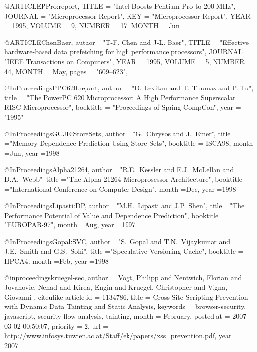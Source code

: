 @ARTICLE{PPro:report,
        TITLE = "Intel Boosts Pentium Pro to 200 MHz",
        JOURNAL = "Microprocessor Report",
        KEY = "Microprocessor Report",
        YEAR = 1995,
        VOLUME = 9,
        NUMBER = 17,
        MONTH = Jun
}


@ARTICLE{ChenBaer,
        author ="T-F. Chen and J-L. Baer",
        TITLE = "Effective hardware-based data prefetching for high performance processors",
        JOURNAL = "IEEE Transactions on Computers",
        YEAR = 1995,
        VOLUME = 5,
        NUMBER = 44,
        MONTH = May,
        pages = "609--623",
}

@InProceedings{PPC620:report,
  author =       "D. Levitan and T. Thomas and P. Tu",
  title =        "The PowerPC 620 Microprocessor: A High Performance Superscalar RISC Microprocessor",
  booktitle =    "Proceedings of Spring CompCon",
  year =         "1995"
}


@InProceedings{GCJE:StoreSets,
        author          ="G.~Chrysos and J.~Emer",
        title           ="Memory Dependence Prediction Using Store Sets",
        booktitle       = ISCA98,
        month           =Jun,
        year            =1998
}

@InProceedings{Alpha21264,
        author          ="R.E.~Kessler and E.J.~McLellan and D.A.~Webb",
        title           ="The Alpha 21264 Microprosessor Architecture",
        booktitle       ="International Conference on Computer Design",
        month           =Dec,
        year            =1998
}


@InProceedings{Lipasti:DP,
        author          ="M.H.~Lipasti and J.P. Shen",
        title           ="The Performance Potential of Value and Dependence Prediction",
        booktitle       = "EUROPAR-97",
        month           =Aug,
        year            =1997
}

@InProceedings{Gopal:SVC,
        author          ="S.~Gopal and T.N.~Vijaykumar and J.E.~Smith
		  and G.S.~Sohi",
        title           ="Speculative Versioning Cache",
        booktitle       = HPCA4,
        month           =Feb,
        year            =1998
}

@inproceedings{kruegel-sec,
   author = {Vogt, Philipp   and Nentwich, Florian   and Jovanovic, Nenad   and Kirda, Engin   and Kruegel, Christopher   and Vigna, Giovanni  },
   citeulike-article-id = {1134786},
   title = {Cross Site Scripting Prevention with Dynamic Data Tainting and Static Analysis},
   keywords = {browser-security, javascript, security-flow-analysis, tainting},
   month = {February},
   posted-at = {2007-03-02 00:50:07},
   priority = {2},
   url = {http://www.infosys.tuwien.ac.at/Staff/ek/papers/xss\_prevention.pdf},
   year = {2007}
}

